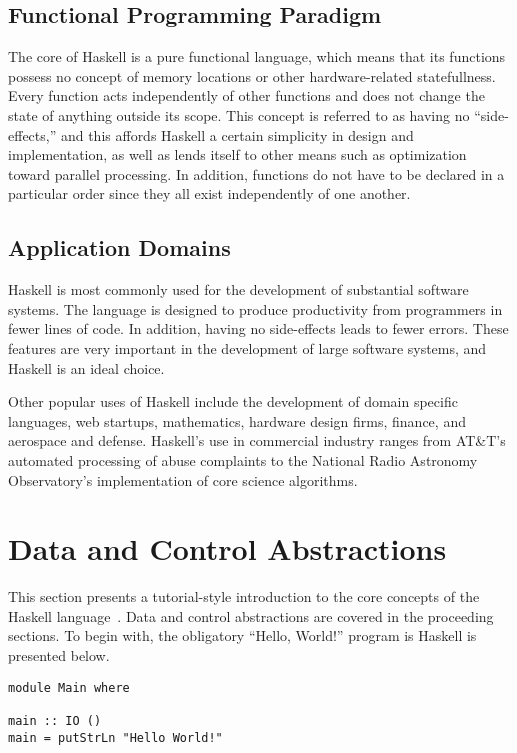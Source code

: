 \documentclass[titlepage,12pt]{article}
\begin{document}
\subsection{Functional Programming Paradigm}

The core of Haskell is a pure functional language, which means that its functions possess no concept of memory locations or other
hardware-related statefullness. Every function acts independently of other functions and does not change the state of anything outside 
its scope. This concept is referred to as having no ``side-effects,'' and this affords Haskell a certain simplicity in design
and implementation, as well as lends itself to other means such as optimization toward parallel processing. In addition,
functions do not have to be declared in a particular order since they all exist independently of one another. 

\subsection{Application Domains}

Haskell is most commonly used for the development of substantial software systems. The language is designed to produce
productivity from programmers in fewer lines of code. In addition, having no side-effects leads to fewer errors.
These features are very important in the development of large software systems, and Haskell is an ideal choice. 

Other popular uses of Haskell include the development of domain specific languages, web startups, mathematics, 
hardware design firms, finance, and aerospace and defense. Haskell's use in commercial industry ranges from AT\&T's 
automated processing of abuse complaints to the National Radio Astronomy Observatory’s implementation of core science algorithms.


\section{Data and Control Abstractions}
This section presents a tutorial-style introduction to the core concepts of
the Haskell language~\cite{learnyouahaskell}.  Data and control abstractions are covered
in the proceeding sections.  To begin with, the obligatory ``Hello, World!'' program is Haskell
is presented below.

\begin{verbatim}
module Main where

main :: IO ()
main = putStrLn "Hello World!"
\end{verbatim}
\end{document}
